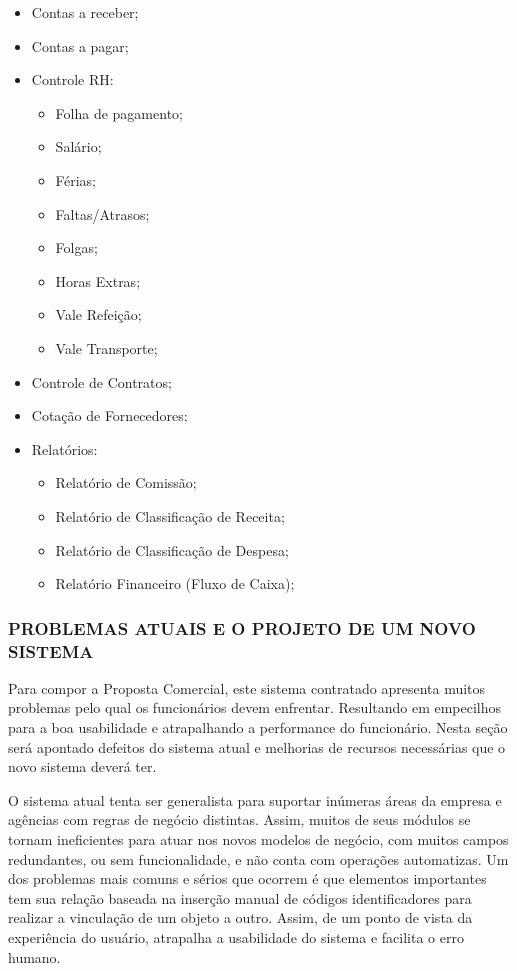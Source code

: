 \documentclass[
  12pt,            %
  openany,
  oneside,
  a4paper,         %
  english,      %
  brazil
]{article}
\numberwithin{figure}{section}
\numberwithin{table}{section}
\begin{document}
{\singlespacing
\begin{itemize}
  \item Contas a receber;
  \item Contas a pagar;
  \item Controle RH:
  \begin{itemize}
    \item Folha de pagamento;
    \item Salário;
    \item Férias;
    \item Faltas/Atrasos;
    \item Folgas;
    \item Horas Extras;
    \item Vale Refeição;
    \item Vale Transporte;
  \end{itemize}
  \item Controle de Contratos;
  \item Cotação de Fornecedores;
  \item Relatórios:
  \begin{itemize}
    \item Relatório de Comissão;
    \item Relatório de Classificação de Receita;
    \item Relatório de Classificação de Despesa;
    \item Relatório Financeiro (Fluxo de Caixa);
  \end{itemize}
\end{itemize}
}


\subsubsection{PROBLEMAS ATUAIS E O PROJETO DE UM NOVO SISTEMA}
\label{sec:2.1.1}

Para compor a Proposta Comercial, este sistema contratado apresenta muitos problemas pelo qual os funcionários devem enfrentar. Resultando em empecilhos para a boa usabilidade e atrapalhando a performance do funcionário. Nesta seção será apontado defeitos do sistema atual e melhorias de recursos necessárias que o novo sistema deverá ter.

O sistema atual tenta ser generalista para suportar inúmeras áreas da empresa e agências com regras de negócio distintas. Assim, muitos de seus módulos se tornam ineficientes para atuar nos novos modelos de negócio, com muitos campos redundantes, ou sem funcionalidade, e não conta com operações automatizas. Um dos problemas mais comuns e sérios que ocorrem é que elementos importantes tem sua relação baseada na inserção manual de códigos identificadores para realizar a vinculação de um objeto a outro. Assim, de um ponto de vista da experiência do usuário, atrapalha a usabilidade do sistema e facilita o erro humano.
\end{document}

